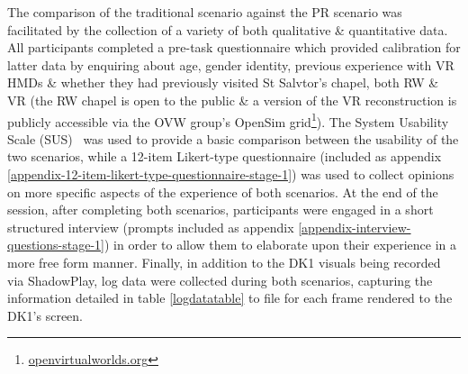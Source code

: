 The comparison of the traditional scenario against the PR scenario was facilitated by the collection of a variety of both qualitative \& quantitative data. All participants completed a pre-task questionnaire which provided calibration for latter data by enquiring about age, gender identity, previous experience with VR HMDs \& whether they had previously visited St Salvtor's chapel, both RW \& VR (the RW chapel is open to the public \& a version of the VR reconstruction is publicly accessible via the OVW group's OpenSim grid\footnote{\url{openvirtualworlds.org}}). The System Usability Scale (SUS)~\cite{Brooke1996} was used to provide a basic comparison between the usability of the two scenarios, while a 12-item Likert-type questionnaire (included as appendix \ref{appendix-12-item-likert-type-questionnaire-stage-1}) was used to collect opinions on more specific aspects of the experience of both scenarios. At the end of the session, after completing both scenarios, participants were engaged in a short structured interview (prompts included as appendix \ref{appendix-interview-questions-stage-1}) in order to allow them to elaborate upon their experience in a more free form manner. Finally, in addition to the DK1 visuals being recorded via ShadowPlay, log data were collected during both scenarios, capturing the information detailed in table \ref{logdatatable} to file for each frame rendered to the DK1's screen.

